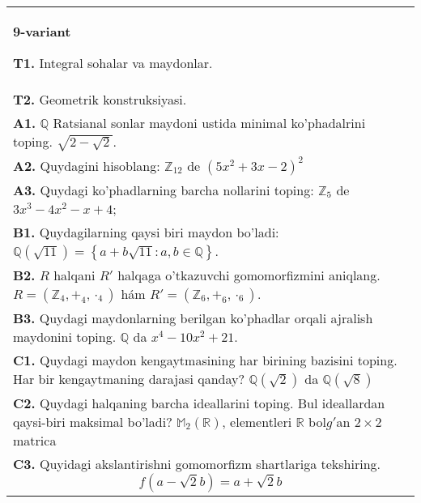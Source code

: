 \documentclass{article}
\begin{document}
\begin{tabular}{m{17cm}}
\textbf{9-variant}
\newline

\textbf{T1.} Integral sohalar va maydonlar. \\
\textbf{T2.} Geometrik konstruksiyasi. \\
\textbf{A1.} \(\mathbb{Q}\) Ratsianal sonlar maydoni ustida minimal ko'phadalrini toping.
\(\sqrt{2 - \sqrt{2}}\). \\
\textbf{A2.} Quydagini hisoblang:
\(\mathbb{Z}_{12}\) de \(\left( 5x^{2} + 3x - 2 \right)^{2}\) \\
\textbf{A3.} Quydagi ko'phadlarning barcha nollarini toping:
\(\mathbb{Z}_{5}\) de \(3x^{3} - 4x^{2} - x + 4\); \\
\textbf{B1.} Quydagilarning qaysi biri maydon bo'ladi:
\(\mathbb{Q}\left( \sqrt{11} \right) = \left\{ a + b\sqrt{11}:a,b \in \mathbb{Q} \right\}\). \\
\textbf{B2.} \(R\) halqani \(R'\) halqaga o'tkazuvchi gomomorfizmini aniqlang.
\(R = (\mathbb{Z}_{4}, +_{4}, \cdot_{4})\) hám \(R' = (\mathbb{Z}_{6}, +_{6}, \cdot_{6})\). \\
\textbf{B3.} Quydagi maydonlarning berilgan ko'phadlar orqali ajralish maydonini toping.
\(\mathbb{Q}\) da \(x^{4} - 10x^{2} + 21\). \\
\textbf{C1.} Quydagi maydon kengaytmasining har birining bazisini toping. Har bir kengaytmaning darajasi qanday?
\(\mathbb{Q}\left( \sqrt{2} \right)\) da \(\mathbb{Q}\left( \sqrt{8} \right)\) \\
\textbf{C2.} Quydagi halqaning barcha ideallarini toping. Bul ideallardan qaysi-biri maksimal bo'ladi?
\(\mathbb{M}_{2}\left( \mathbb{R} \right)\), elementleri \(\mathbb{R}\) bol\(g'\)an \(2 \times 2\) matrica \\
\textbf{C3.} Quyidagi akslantirishni gomomorfizm shartlariga tekshiring.
\[f\left( a - \sqrt{2}b \right) = a + \sqrt{2}b\] \\

\end{tabular}
\vspace{1cm}
\end{document}
